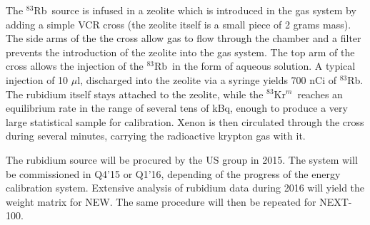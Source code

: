 The $^{83}$Rb~source is infused in a zeolite which is introduced in the gas system by adding a simple VCR cross (the zeolite itself is a small piece of 2 grams mass). The side arms of the the cross allow gas to flow through the chamber and a filter prevents the introduction of the zeolite into the gas system. The top arm of the cross allows the injection of the $^{83}$Rb~in the form of aqueous solution. A typical injection of 10 $\mu$l, discharged into the zeolite via a syringe yields 700 nCi of $^{83}$Rb. The rubidium itself stays attached to the zeolite, while the $^{83}$Kr$^m$~reaches an equilibrium rate in the range of several tens of kBq, enough to produce a very large statistical sample for calibration. Xenon is then circulated through the cross during several minutes, carrying the radioactive krypton gas with it.  

The rubidium source will be procured by the US group in 2015. The system will be commissioned in Q4'15 or Q1'16, depending of the progress of the energy calibration system. Extensive analysis of rubidium data during 2016 will yield the weight matrix for NEW. The same procedure will then be repeated for NEXT-100. 

